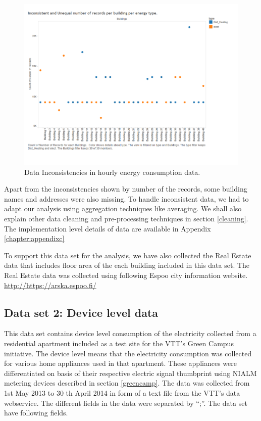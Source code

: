 \begin{figure}[!ht]
    \begin{center}
      \includegraphics[width=\textwidth]{images/incon.pdf}
      \caption{Data Inconsistencies in hourly energy consumption data.}
      \label{fig:incon}
    \end{center}
  \end{figure} 
Apart from the inconsistencies shown by number of the records, some building names and addresses were also missing. To handle inconsistent data, we had to adapt our analysis using aggregation techniques like averaging. We shall also explain other data cleaning and pre-processing techniques in section \ref{cleaning}. The implementation level details of data are available in Appendix \ref{chapter:appendixc}

To support this data set for the analysis, we have also collected the Real Estate data that includes floor area of the each building included in this data set. The Real Estate data was collected using following Espoo city information website.
\url{http://https://arska.espoo.fi/}


\subsection{Data set 2: Device level data} \label{nialmset}
This data set contains device level consumption of the electricity collected from a residential apartment included as a test site for the VTT's Green Campus initiative. The device level means that the electricity consumption was collected for various home appliances used in that apartment. These appliances were differentiated on basis of their respective electric signal thumbprint using NIALM metering devices described in section \ref{greencamp}. The data was collected from 1st May 2013 to 30 th April 2014 in form of a text file from the VTT's data webservice. The different fields in the data were separated by ``;''. The data set have following fields.


